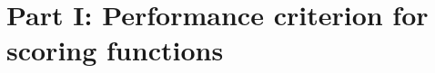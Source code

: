 \documentclass[9pt]{beamer}
\newcommand\red{\color{red} }
\newcommand\blue{\color{blue} }
\begin{document}
\section{Part I: Performance criterion for scoring functions}








\end{document}

